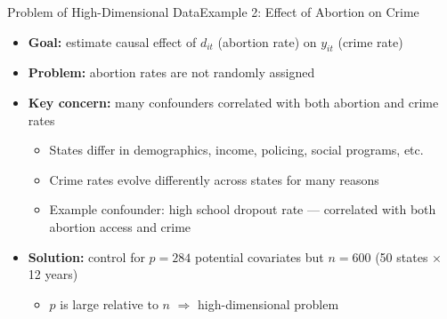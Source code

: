 \documentclass[dvipsnames,hyperref={pdfpagelabels=false}]{beamer}
\begin{document}
	\begin{frame}{Problem of High-Dimensional Data}{Example 2: Effect of Abortion on Crime}
    \begin{itemize}
        \item \textbf{Goal:} estimate causal effect of $d_{it}$ 
        (abortion rate) on $y_{it}$ (crime rate)
        \vspace{0.2cm}
        \item \textbf{Problem:} abortion rates are not randomly assigned
        \vspace{0.2cm}
        \item \textbf{Key concern:} many confounders correlated with 
        both abortion and crime rates
        \begin{itemize}
            \vspace{0.2cm}
            \item States differ in demographics, income, policing, 
            social programs, etc.
            \vspace{0.2cm}
            \item Crime rates evolve differently across states 
            for many reasons
            \vspace{0.2cm}
            \item Example confounder: high school dropout rate 
            --- correlated with both abortion access and crime
        \end{itemize}
        \vspace{0.2cm}
        \item \textbf{Solution:} control for $p = 284$ potential 
        covariates but $n = 600$ (50 states $\times$ 12 years)
        \begin{itemize}
            \vspace{0.1cm}
            \item $p$ is large relative to $n$ $\Rightarrow$ 
            high-dimensional problem
        \end{itemize}
    \end{itemize}
\end{frame}
\end{document}
